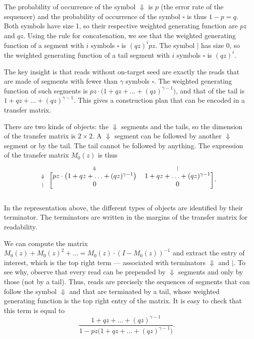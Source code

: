 \documentclass{article}
\begin{document}
The probability of occurrence of the symbol $\Downarrow$ is $p$ (the error
rate of the sequencer) and the probability of occurrence of the symbol
$\square$ is thus $1-p = q$. Both symbols have size 1, so their respective
weighted generating function are $pz$ and $qz$. Using the rule for
concatenation, we see that the weighted generating function of a segment
with $i$ symbols $\square$ is $(qz)^ipz$. The symbol $|$ has size 0, so
the weighted generating function of a tail segment with $i$ symbols
$\square$ is $(qz)^i$.

The key insight is that reads without on-target seed are exactly the reads
that are made of segments with fewer than $\gamma$ symbols $\square$. The
weighted generating function of such segments is $pz \cdot \big(
1+qz+\ldots+(qz)^{\gamma-1} \big)$, and that of the tail is
$1+qz+\ldots+(qz)^{\gamma-1}$. This gives a construction plan that can be
encoded in a transfer matrix.

There are two kinds of objects: the $\Downarrow$ segments and the tails,
so the dimension of the transfer matrix is $2 \times 2$. A $\Downarrow$
segment can be followed by another $\Downarrow$ segment or by the tail.
The tail cannot be followed by anything. The expression of the transfer
matrix $M_0(z)$ is thus
\begin{equation*}
\begin{blockarray}{ccc}
   & \scriptstyle{\Downarrow} & \scriptstyle{|} \\
\begin{block}{c[cc]}
\scriptstyle{\Downarrow} & pz \cdot \big( 1+qz+\ldots+(qz)^{\gamma-1}
\big)  & 1+qz+\ldots+(qz)^{\gamma-1} \\
\scriptstyle{|} & 0 & 0 \\
\end{block}
\end{blockarray}.
\end{equation*}

In the representation above, the different types of objects are identified
by their terminator. The terminators are written in the margins of the
transfer matrix for readability.

We can compute the matrix $M_0(z) + M_0(z)^2 + \ldots = M_0(z) \cdot
(I-M_0(z))^{-1}$ and extract the entry of interest, which is the top right
term --- associated with terminators $\Downarrow$ and $|$. To see why,
observe that every read can be prepended by $\Downarrow$ segments and only
by those (not by a tail). Thus, reads are precisely the sequences of
segments that can follow the symbol $\Downarrow$ and that are terminated
by a tail, whose weighted generating function is the top right entry of
the matrix. It is easy to check that this term is equal to
\begin{equation}
\label{eq:F}
\frac{1+qz+\ldots+(qz)^{\gamma-1}}
  {1-pz \big(1+qz+\ldots+(qz)^{\gamma-1} \big)}.
\end{equation}
\end{document}
